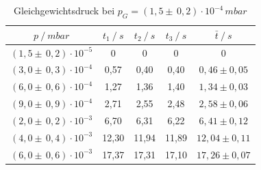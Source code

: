 \begin{table}[H]
\centering
\label{tab:leck_Turbo3}
\begin{tabular}{c|c|c|c|c}
	{$p \:/\: \si{mbar}$} & {$t_1 \:/\: \si{s} $} & {$t_2 \:/\: \si{s} $} & {$t_3 \:/\: \si{s} $} & {$\bar{t} \:/\: \si{s}$}\\
\midrule
$(1,5 \pm \, 0,2)\cdot 10^{-5}$ &0 &0 &0 &0\\
$(3,0 \pm \, 0,3)\cdot 10^{-4}$ &   0,57 &  0,40 &  0,40 & $0,46 \pm 0,05$\\
$(6,0 \pm \, 0,6)\cdot 10^{-4}$ &   1,27  &  1,36 &  1,40 & $1,34 \pm 0,03 $\\
$(9,0 \pm \, 0,9)\cdot 10^{-4}$ &   2,71 &  2,55 &  2,48 & $2,58 \pm 0,06 $\\
$(2,0 \pm \, 0,2)\cdot 10^{-3}$ &   6,70 &  6,31 &  6,22 & $6,41 \pm 0,12 $\\
$(4,0 \pm \, 0,4)\cdot 10^{-3}$ &   12,30 &  11,94 &  11,89 & $12,04 \pm 0,11 $\\
$(6,0 \pm \, 0,6)\cdot 10^{-3}$ &  17,37 & 17,31 & 17,10 & $17,26 \pm 0,07 $\\
\end{tabular}
\caption{Gleichgewichtsdruck bei $p_G=(1,5 \pm \, 0,2)\cdot 10^{-4} \, \si{mbar}$}
\end{table}


